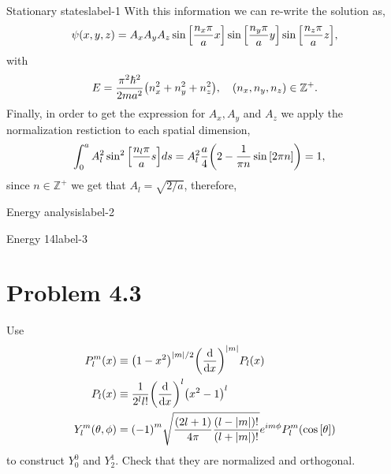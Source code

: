 \documentclass[../main.tex]{subfiles}
\begin{document}
\begin{sol}{Stationary states}{label-1}
    With this information we can re-write the solution as,
    \begin{gather*}
        \psi\qty(x,y,z)=A_x A_y A_z\sin\qty[\frac{n_x\pi}{a} x]\sin\qty[\frac{n_y\pi}{a} y]\sin\qty[\frac{n_z\pi}{a} z],
    \end{gather*} 
    with
    \begin{gather*}
        E=\frac{\pi^2\hbar^2}{2ma^2}\qty(n_x^2+n_y^2+n_z^2), \quad \qty(n_x,n_y,n_z)\in\mathbb{Z}^+.
    \end{gather*}
    Finally, in order to get the expression for $A_x,A_y$ and $A_z$ we apply the normalization restiction to each spatial dimension,
    \begin{align*}
        \int_0^a A_l^2\sin^2\qty[\frac{n_l\pi}{a} s] ds &= A^2_l\frac{a}{4}\qty(2-\frac{1}{\pi n}\sin\qty[2\pi n]) = 1,
    \end{align*}
    since $n\in\mathbb{Z}^+$ we get that $A_l=\sqrt{2/a}$, therefore,
\end{sol}


\begin{sol}{Energy analysis}{label-2}

\end{sol}

\begin{sol}{Energy 14}{label-3}

\end{sol}


\section{Problem 4.3}

Use 
\begin{align*}
    P^m_l(x)&\equiv\qty(1-x^2)^{\abs{m}/2}\qty(\dv{x})^{\abs{m}}P_l(x) \\
    P_l\qty(x) &\equiv\frac{1}{2^l l!}\qty(\dv{x})^l\qty(x^2-1)^l \\
    Y^m_l\qty(\theta,\phi) &=\qty(-1)^{m}\sqrt{\frac{\qty(2l+1)}{4\pi}\frac{\qty(l-\abs{m})!}{\qty(l+\abs{m})!}}e^{im\phi}P^m_l\qty(\cos\qty[\theta]) 
\end{align*}
to construct $Y^0_0$ and $Y^1_2$.
Check that they are normalized and orthogonal.
\end{document}
